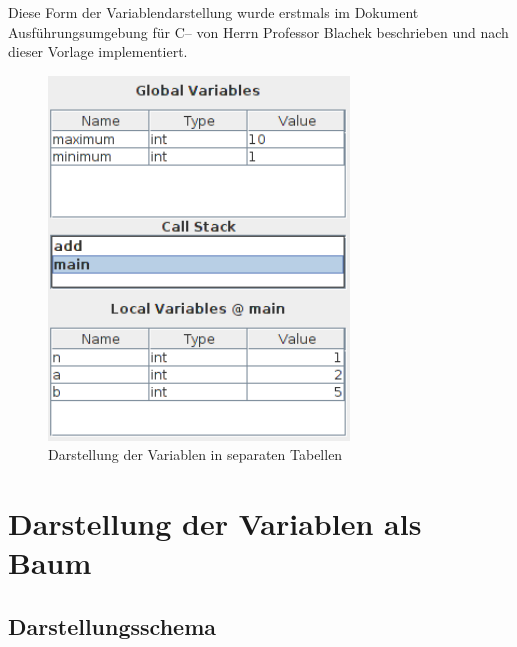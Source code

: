 Diese Form der Variablendarstellung wurde erstmals im Dokument Ausführungsumgebung für C-- von Herrn Professor Blachek beschrieben und nach dieser Vorlage implementiert.
\begin{figure}
\includegraphics[width=8cm]{./media/images/gui/var/callstack.png}
\caption{Darstellung der Variablen in separaten Tabellen}
\label{var_sep}
\end{figure}

\section{Darstellung der Variablen als Baum}

\subsection{Darstellungsschema}

